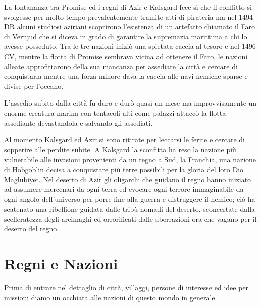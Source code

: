\documentclass[letterpaper,twocolumn,openany,nodeprecatedcode]{dndbook}
\begin{document}
La lontananza tra Promise ed i regni di Azir e Kalsgard fece sì che il conflitto si svolgesse per molto tempo prevalentemente tramite atti di pirateria ma nel 1494 DR alcuni studiosi aziriani scoprirono l'esistenza di un artefatto chiamato il Faro di Vernjud che si diceva in grado di garantire la supremazia marittima a chi lo avesse posseduto. Tra le tre nazioni iniziò una spietata caccia al tesoro e nel 1496 CV, mentre la flotta di Promise sembrava vicina ad ottenere il Faro, le nazioni alleate approfittarono della sua mancanza per assediare la città e cercare di conquistarla mentre una forza minore dava la caccia alle navi nemiche sparse e divise per l'oceano.

L'assedio subito dalla città fu duro e durò quasi un mese ma improvvisamente un enorme creatura marina con tentacoli alti come palazzi attaccò la flotta assediante devastandola e salvando gli assediati.

Al momento Kalsgard ed Azir si sono ritirate per leccarsi le ferite e cercare di sopperire alle perdite subite. A Kalsgard la sconfitta ha reso la nazione più vulnerabile alle invasioni provenienti da un regno a Sud, la Franchia, una nazione di Hobgoblin decisa a conquistare più terre possibili per la gloria del loro Dio Maglubiyet. Nel deserto di Azir gli oligarchi che guidano il regno hanno iniziato ad assumere mercenari da ogni terra ed evocare ogni terrore immaginabile da ogni angolo dell'universo per porre fine alla guerra e distruggere il nemico; ciò ha scatenato una ribellione guidata dalle tribù nomadi del deserto, sconcertate dalla scelleratezza degli arcimaghi ed orrorificati dalle aberrazioni ora che vagano per il deserto del regno.

\chapter{Regni e Nazioni}
Prima di entrare nel dettaglio di città, villaggi, persone di interesse ed idee per missioni diamo un occhiata alle nazioni di questo mondo in generale.
\end{document}

